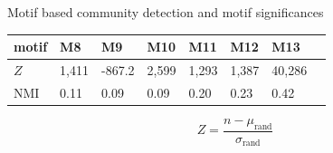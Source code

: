 \documentclass[unknownkeysallowed]{beamer}
\begin{document}
\begin{frame}{Motif based community detection and motif significances}
\begin{tabular}{l|lllllll}
    motif & M8 & M9 & M10 & M11 & M12 & M13 & \\ \hline
    $Z$ & 1,411 & -867.2 & 2,599 & 1,293 & 1,387 & 40,286 & \\
    NMI & 0.11 & 0.09 & 0.09 & 0.20 & 0.23 & 0.42 & \\
  \end{tabular}

  \begin{equation*}
    Z = \frac{n - \mu_{\mathrm{rand}}}{\sigma_{\mathrm{rand}}}
  \end{equation*}
\end{frame}
\end{document}
